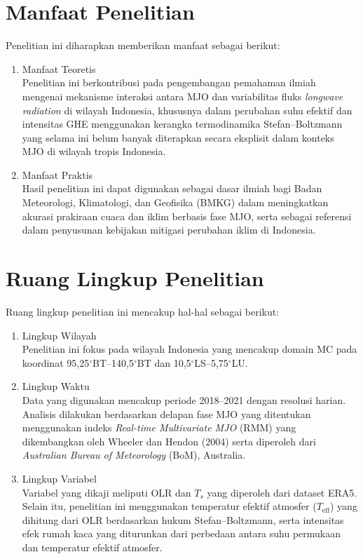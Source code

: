 \documentclass[12pt,a4paper]{report}
\begin{document}
\section{Manfaat Penelitian}
Penelitian ini diharapkan memberikan manfaat sebagai berikut:
\begin{enumerate}
    \item {Manfaat Teoretis} \\
    Penelitian ini berkontribusi pada pengembangan pemahaman ilmiah 
    mengenai mekanisme interaksi antara MJO dan variabilitas fluks \textit{longwave radiation} di wilayah Indonesia, khususnya dalam 
     perubahan suhu efektif dan intensitas 
    GHE menggunakan kerangka termodinamika Stefan--Boltzmann yang selama ini belum banyak diterapkan secara 
    eksplisit dalam konteks MJO di wilayah tropis Indonesia.
    
    \item {Manfaat Praktis} \\
    Hasil penelitian ini dapat digunakan sebagai dasar ilmiah bagi 
    Badan Meteorologi, Klimatologi, dan Geofisika (BMKG) dalam 
    meningkatkan akurasi prakiraan cuaca dan iklim berbasis fase MJO, 
    serta sebagai referensi dalam penyusunan kebijakan mitigasi 
    perubahan iklim di Indonesia.
    
\end{enumerate}

\section{Ruang Lingkup Penelitian}
Ruang lingkup penelitian ini mencakup hal-hal sebagai berikut:
\begin{enumerate}

    \item {Lingkup Wilayah} \\
    Penelitian ini fokus pada wilayah Indonesia yang mencakup domain MC pada koordinat
    95,25$^{\circ}$BT--140,5$^{\circ}$BT dan
    10,5$^{\circ}$LS--5,75$^{\circ}$LU.

    \item {Lingkup Waktu} \\
    Data yang digunakan mencakup periode 2018--2021 dengan resolusi harian.
    Analisis dilakukan berdasarkan delapan fase MJO yang ditentukan menggunakan indeks
    \textit{Real-time Multivariate MJO} (RMM) yang dikembangkan oleh
    Wheeler dan Hendon (2004) serta diperoleh dari
    \textit{Australian Bureau of Meteorology} (BoM), Australia.

    \item {Lingkup Variabel} \\
    Variabel yang dikaji meliputi OLR dan $T_s$ yang diperoleh dari dataset ERA5.
    Selain itu, penelitian ini menggunakan temperatur efektif atmosfer
    ($T_{\mathrm{eff}}$) yang dihitung dari OLR berdasarkan hukum
    Stefan--Boltzmann, serta intensitas efek rumah kaca yang diturunkan
    dari perbedaan antara suhu permukaan dan temperatur efektif atmosfer.

\end{enumerate}
\end{document}
